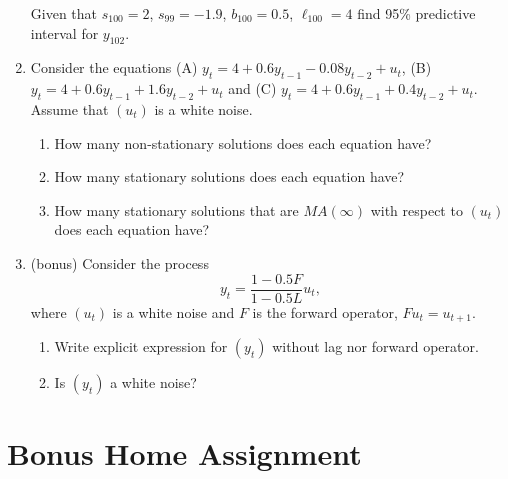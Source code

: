 \documentclass[12pt]{article}
\begin{document}
\begin{enumerate}
Given that $s_{100} = 2$, $s_{99} = -1.9$, $b_{100} = 0.5$, $\ell_{100} = 4$ find 95\% predictive interval for $y_{102}$. 


\item Consider the equations (A) $y_t = 4 + 0.6 y_{t-1} - 0.08y_{t-2} + u_t$, (B) $y_t = 4 + 0.6 y_{t-1} + 1.6y_{t-2} + u_t$
and (C) $y_t = 4 + 0.6 y_{t-1} + 0.4 y_{t-2} + u_t$. 
Assume that $(u_t)$ is a white noise. 
  
  \begin{enumerate}
    \item How many non-stationary solutions does each equation have?
    \item How many stationary solutions does each equation have?
    \item How many stationary solutions that are $MA(\infty)$ with respect to $(u_t)$ does each equation have?
  \end{enumerate}


\item (bonus) Consider the process 
\[
y_t = \frac{1-0.5F}{1-0.5L} u_t,
\]
where $(u_t)$ is a white noise and $F$ is the forward operator, $F u_t = u_{t + 1}$.
\begin{enumerate}
  \item Write explicit expression for $(y_t)$ without lag nor forward operator.
  \item Is $(y_t)$ a white noise?
\end{enumerate}


\end{enumerate}




\newpage
{}
\section*{Bonus Home Assignment}
\end{document}

